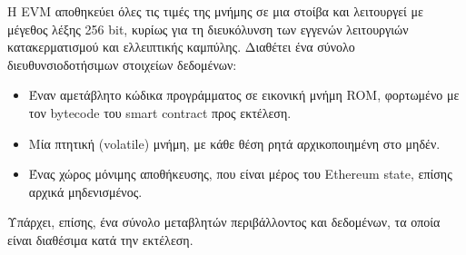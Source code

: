 Η EVM αποθηκεύει όλες τις τιμές της μνήμης σε μια στοίβα και λειτουργεί με μέγεθος λέξης 256 bit, κυρίως για τη διευκόλυνση των εγγενών λειτουργιών κατακερματισμού και ελλειπτικής καμπύλης. Διαθέτει ένα σύνολο διευθυνσιοδοτήσιμων στοιχείων δεδομένων:

\begin{itemize}
	\item Έναν αμετάβλητο κώδικα προγράμματος σε εικονική μνήμη ROM, φορτωμένο με τον \textenglish{bytecode} του smart contract προς εκτέλεση.
	\item Μία πτητική (volatile) μνήμη, με κάθε θέση ρητά αρχικοποιημένη στο μηδέν.
	\item Ένας χώρος μόνιμης αποθήκευσης, που είναι μέρος του Ethereum state, επίσης αρχικά μηδενισμένος.
\end{itemize}

Υπάρχει, επίσης, ένα σύνολο μεταβλητών περιβάλλοντος και δεδομένων, τα οποία είναι διαθέσιμα κατά την εκτέλεση.\cite{2.6-ethereum-mastering}
